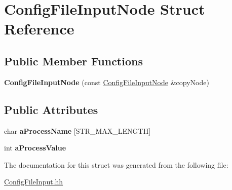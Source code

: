\hypertarget{struct_config_file_input_node}{}\section{Config\+File\+Input\+Node Struct Reference}
\label{struct_config_file_input_node}
\subsection*{Public Member Functions}
\begin{DoxyCompactItemize}
\item 
{\bfseries Config\+File\+Input\+Node} (const \hyperlink{struct_config_file_input_node}{Config\+File\+Input\+Node} \&copy\+Node)\hypertarget{struct_config_file_input_node_a69ceebec9a7bae4b3223a3dbfad03629}{}\label{struct_config_file_input_node_a69ceebec9a7bae4b3223a3dbfad03629}

\end{DoxyCompactItemize}
\subsection*{Public Attributes}
\begin{DoxyCompactItemize}
\item 
char {\bfseries a\+Process\+Name} \mbox{[}S\+T\+R\+\_\+\+M\+A\+X\+\_\+\+L\+E\+N\+G\+TH\mbox{]}\hypertarget{struct_config_file_input_node_a93ab4bcc86e96f4845b7a7ee05017d0b}{}\label{struct_config_file_input_node_a93ab4bcc86e96f4845b7a7ee05017d0b}

\item 
int {\bfseries a\+Process\+Value}\hypertarget{struct_config_file_input_node_aa82078bb2516e104d5656eaaa5e3222e}{}\label{struct_config_file_input_node_aa82078bb2516e104d5656eaaa5e3222e}

\end{DoxyCompactItemize}


The documentation for this struct was generated from the following file\+:\begin{DoxyCompactItemize}
\item 
\hyperlink{_config_file_input_8hh}{Config\+File\+Input.\+hh}\end{DoxyCompactItemize}
